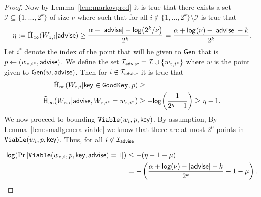 \begin{proof}
\noindent
Now by Lemma~\ref{lem:markovpred} it is true that there exists a set $\mathcal{I}\subseteq \{1,...,2^k\}$ of size $\nu$ where  such that for all $i\not \in \{1,...,2^k\} \setminus\mathcal{I}$ is true that 
\[
\eta:=\tilde{\mathrm{H}}_\infty(W_{z,i} | {\mathsf{advise}}) \ge \frac{\alpha -|{\mathsf{advise}}| - \mathsf{log}\!\left(2^k/\nu\right)}{2^k} = \frac{\alpha +\mathsf{log}\!\left(\nu\right)-|{\mathsf{advise}}| - k}{2^k}.
\]
Let $i^*$ denote the index of the point that will be given to ${\mathsf{Gen}}$ that is $p\leftarrow (w_{z,i^*}, {\mathsf{advise}})$.  We define the set $\mathcal{I}_{\mathsf{advise}} = \mathcal{I} \cup \{w_{z,i^*}\}$ where $w$ is the point given to ${\mathsf{Gen}}(w, {\mathsf{advise}})$.  
Then for $i\not\in \mathcal{I}_{{\mathsf{advise}}}$ it is true that 
\begin{align*}
\tilde{\mathrm{H}}_\infty(W_{z,i} | \mathsf{key} \in \mathtt{GoodKey}, p)&\ge \\
\tilde{\mathrm{H}}_\infty(W_{z,i} | {\mathsf{advise}}, W_{z,i^*}= w_{z,i^*}) &\ge -\mathsf{log}\!\left(\frac{1}{2^{\eta}-1}\right) \ge \eta-1.
\end{align*}
We now proceed to bounding $\mathtt{Viable}(w_i, p, \mathsf{key})$.  By assumption, By Lemma~\ref{lem:smallgeneralviable} we know that there are at most $2^\mu$ points in $\mathtt{Viable}(w_i, p, \mathsf{key})$.  Thus, for all $i\not \in\mathcal{I}_{{\mathsf{advise}}}$ 

\begin{align*}
\mathsf{log}\!\left(\Pr\left[\mathtt{Viable}(w_{z,i}, p, \mathsf{key}, {\mathsf{advise}}) = 1 \right]\right)&\le - (\eta-1 -\mu)\\
&=-\left(\frac{\alpha +\mathsf{log}\!\left(\nu\right)-|{\mathsf{advise}}| - k}{2^k}-1-\mu\right).
\end{align*}
\end{proof}

